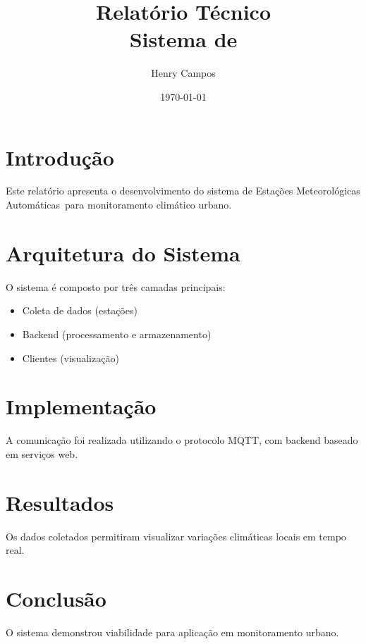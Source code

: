 \documentclass[12pt]{article}
\title{Relatório Técnico \\ Sistema de \ema}
\author{Henry Campos}
\date{\today}
\newcommand{\ema}{Estações Meteorológicas Automáticas}
\newcommand{\mqtt}{MQTT}
\begin{document}
\maketitle
\tableofcontents
\newpage

\section{Introdução}

Este relatório apresenta o desenvolvimento do sistema de \ema\ para monitoramento climático urbano.

\section{Arquitetura do Sistema}

O sistema é composto por três camadas principais:

\begin{itemize}
    \item Coleta de dados (estações)
    \item Backend (processamento e armazenamento)
    \item Clientes (visualização)
\end{itemize}

\section{Implementação}

A comunicação foi realizada utilizando o protocolo \mqtt, com backend baseado em serviços web.

\section{Resultados}

Os dados coletados permitiram visualizar variações climáticas locais em tempo real.

\section{Conclusão}

O sistema demonstrou viabilidade para aplicação em monitoramento urbano.



\end{document}
